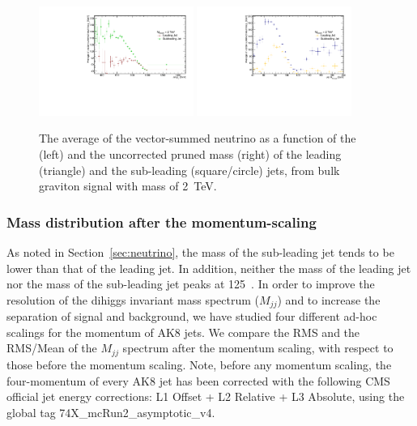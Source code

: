 \begin{figure}[htbp]
   \centering
   \includegraphics[width=0.45\textwidth]{figures/neutrino_study/tprof_neupt_jetpt_2000.pdf}
   \includegraphics[width=0.45\textwidth]{figures/neutrino_study/tprof_neupt_prmass_2000.pdf}
   \caption{The average of the vector-summed neutrino \pt as a function of the \pt (left) 
     and the uncorrected pruned mass (right) of the leading (triangle) and the 
   sub-leading (square/circle) jets, from bulk graviton signal with mass of 
   2~TeV.}
   \label{fig:neutwo}
\end{figure}

\subsubsection*{Mass distribution after the momentum-scaling}
As noted in Section~\ref{sec:neutrino}, the mass of the 
sub-leading jet tends to be lower than that of the leading jet. 
In addition, neither the mass of the leading jet nor the mass of
the sub-leading jet peaks at 125~\GeV. In order to improve 
the resolution of the dihiggs invariant mass spectrum ($M_{jj}$) and 
to increase the separation of signal and background, we have 
studied four different ad-hoc scalings for the momentum 
of AK8 jets. We compare the RMS and the RMS/Mean of the $M_{jj}$ 
spectrum after the momentum scaling, with respect to those before 
the momentum scaling. 
Note, before any momentum scaling, 
the four-momentum of every AK8 jet has been corrected with the 
following CMS official jet energy corrections: L1 Offset + L2 Relative + L3 
Absolute, using the global tag {\sc 74X\_mcRun2\_asymptotic\_v4}.


